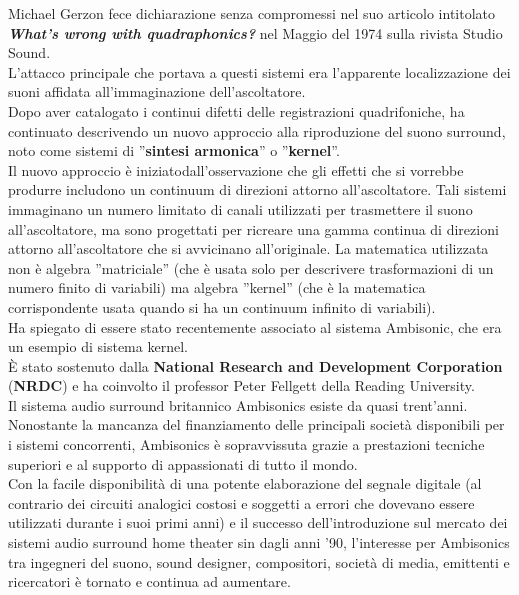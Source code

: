 Michael Gerzon fece dichiarazione senza compromessi nel suo articolo intitolato
\textit{\textbf{What’s wrong with quadraphonics?}} nel Maggio del 1974 sulla rivista Studio Sound.\\
L’attacco principale che portava a questi sistemi era l’apparente localizzazione dei
suoni affidata all’immaginazione dell’ascoltatore.\\
Dopo aver catalogato i continui difetti delle registrazioni quadrifoniche, ha
continuato descrivendo un nuovo approccio alla riproduzione del suono surround,
noto come sistemi di ”\textbf{sintesi armonica}” o ”\textbf{kernel}”.\\
 Il nuovo approccio è iniziatodall’osservazione che gli effetti che si vorrebbe produrre includono un continuum
di direzioni attorno all’ascoltatore. Tali sistemi immaginano un numero
limitato di canali utilizzati per trasmettere il suono all’ascoltatore, ma sono progettati
per ricreare una gamma continua di direzioni attorno all’ascoltatore che
si avvicinano all’originale. La matematica utilizzata non è algebra ”matriciale”
(che è usata solo per descrivere trasformazioni di un numero finito di variabili)
ma algebra ”kernel” (che è la matematica corrispondente usata quando si ha un
continuum infinito di variabili).\\
Ha spiegato di essere stato recentemente associato al sistema Ambisonic, che
era un esempio di sistema kernel.\\ È stato sostenuto dalla \textbf{National Research and
Development Corporation} (\textbf{NRDC}) e ha coinvolto il professor Peter Fellgett della
Reading University.\\
Il sistema audio surround britannico Ambisonics esiste da quasi trent’anni.\\
Nonostante la mancanza del finanziamento delle principali società disponibili
per i sistemi concorrenti, Ambisonics è sopravvissuta grazie a prestazioni tecniche
superiori e al supporto di appassionati di tutto il mondo.\\
Con la facile disponibilità di una potente elaborazione del segnale digitale
 (al contrario dei circuiti analogici costosi e soggetti a errori che dovevano essere utilizzati durante i suoi primi anni)
 e il successo dell'introduzione sul mercato dei sistemi audio surround home theater sin dagli anni '90,
  l'interesse per Ambisonics tra ingegneri del suono, sound designer, compositori, società di media,
  emittenti e ricercatori è tornato e continua ad aumentare.

